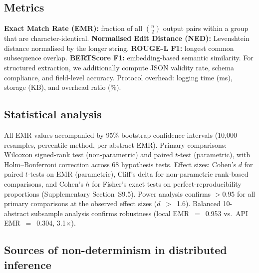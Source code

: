 \documentclass[sn-nature]{sn-jnl}
\begin{document}
\subsection{Metrics}\label{subsec:metrics}

\textbf{Exact Match Rate (EMR):} fraction of all $\binom{n}{2}$ output pairs within a group that are character-identical.
\textbf{Normalised Edit Distance (NED):} Levenshtein distance\cite{levenshtein1966binary} normalised by the longer string.
\textbf{ROUGE-L F1:} longest common subsequence overlap\cite{lin2004rouge}.
\textbf{BERTScore F1:} embedding-based semantic similarity\cite{zhang2020bertscore}.
For structured extraction, we additionally compute JSON validity rate, schema compliance, and field-level accuracy.
Protocol overhead: logging time (ms), storage (KB), and overhead ratio (\%).


\subsection{Statistical analysis}\label{subsec:stats}

All EMR values accompanied by 95\% bootstrap confidence intervals (10{,}000 resamples, percentile method, per-abstract EMR)\cite{efron1993introduction}.
Primary comparisons: Wilcoxon signed-rank test (non-parametric) and paired $t$-test (parametric), with Holm--Bonferroni correction across 68 hypothesis tests.
Effect sizes: Cohen's $d$ for paired $t$-tests on EMR (parametric), Cliff's delta\cite{romano2006appropriate} for non-parametric rank-based comparisons, and Cohen's $h$ for Fisher's exact tests on perfect-reproducibility proportions (Supplementary Section~S9.5).
Power analysis confirms $>$0.95 for all primary comparisons at the observed effect sizes ($d$~$>$~1.6)\cite{cohen1988statistical}.
Balanced 10-abstract subsample analysis confirms robustness (local EMR~$=$~0.953 vs.\ API EMR~$=$~0.304, 3.1$\times$).


\subsection{Sources of non-determinism in distributed inference}\label{subsec:sources}
\end{document}
